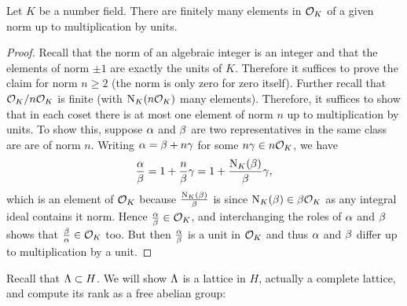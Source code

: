     \begin{lemma}\label{lem:finitely_many_elements_of_fixed_norm}
      Let $K$ be a number field. There are finitely many elements in $\mathcal{O}_{K}$ of a given norm up to multiplication by units.
    \end{lemma}
    \begin{proof}
      Recall that the norm of an algebraic integer is an integer and that the elements of norm $\pm1$ are exactly the units of $K$. Therefore it suffices to prove the claim for norm $n \ge 2$ (the norm is only zero for zero itself). Further recall that $\mathcal{O}_{K}/n\mathcal{O}_{K}$ is finite (with $\operatorname{\mathrm{N}}_{K}(n\mathcal{O}_{K})$ many elements). Therefore, it suffices to show that in each coset there is at most one element of norm $n$ up to multiplication by units. To show this, suppose $\alpha$ and $\beta$ are two representatives in the same class are are of norm $n$. Writing $\alpha = \beta+n\gamma$ for some $n\gamma \in n\mathcal{O}_{K}$, we have
      \[
        \frac{\alpha}{\beta} = 1+\frac{n}{\beta}\gamma = 1+\frac{\operatorname{\mathrm{N}}_{K}(\beta)}{\beta}\gamma,
      \]
      which is an element of $\mathcal{O}_{K}$ because $\frac{\operatorname{\mathrm{N}}_{K}(\beta)}{\beta}$ is since $\operatorname{\mathrm{N}}_{K}(\beta) \in \beta\mathcal{O}_{K}$ as any integral ideal contains it norm. Hence $\frac{\alpha}{\beta} \in \mathcal{O}_{K}$, and interchanging the roles of $\alpha$ and $\beta$ shows that $\frac{\beta}{\alpha} \in \mathcal{O}_{K}$ too. But then $\frac{\alpha}{\beta}$ is a unit in $\mathcal{O}_{K}$ and thus $\alpha$ and $\beta$ differ up to multiplication by a unit.
    \end{proof}

    Recall that $\Lambda \subset H$. We will show $\Lambda$ is a lattice in $H$, actually a complete lattice, and compute its rank as a free abelian group:

